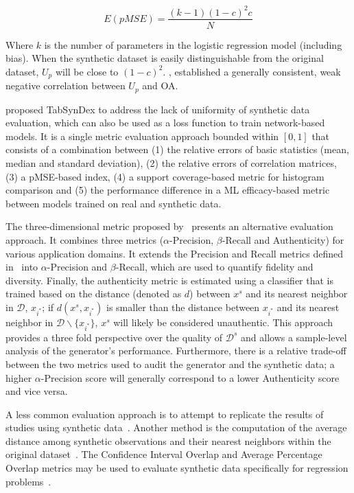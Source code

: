 \begin{equation}
    E(pMSE) = \frac{(k-1)(1-c)^2c}{N}
\end{equation}

Where $k$ is the number of parameters in the logistic regression model
(including bias). When the synthetic dataset is easily distinguishable from
the original dataset, $U_p$ will be close to ${(1-c)}^2$.
\citet{dankar2021fake}, established a generally consistent, weak negative
correlation between $U_p$ and OA\@.

\citet{chundawat2022tabsyndex} proposed TabSynDex to address the lack of
uniformity of synthetic data evaluation, which can also be used as a loss
function to train network-based models. It is a single metric evaluation
approach bounded within $[0,1]$ that consists of a combination between (1) the
relative errors of basic statistics (mean, median and standard deviation), (2)
the relative errors of correlation matrices, (3) a pMSE-based index, (4) a
support coverage-based metric for histogram comparison and (5) the performance
difference in a ML efficacy-based metric between models trained on real and
synthetic data.

The three-dimensional metric proposed by~\citet{alaa2022faithful} presents an
alternative evaluation approach. It combines three metrics
($\alpha$-Precision, $\beta$-Recall and Authenticity) for various application
domains. It extends the Precision and Recall metrics defined
in~\cite{sajjadi2018assessing} into $\alpha$-Precision and $\beta$-Recall,
which are used to quantify fidelity and diversity. Finally, the authenticity
metric is estimated using a classifier that is trained based on the distance
(denoted as $d$) between $x^s$ and its nearest neighbor in $\mathcal{D}$,
$x_{i^*}$; if $d(x^s, x_{i^*})$ is smaller than the distance between $x_{i^*}$
and its nearest neighbor in $\mathcal{D}\backslash \{x_{i^*}\}$, $x^s$ will
likely be considered unauthentic. This approach provides a three fold
perspective over the quality of $\mathcal{D}^s$ and allows a sample-level
analysis of the generator's performance. Furthermore, there is a relative
trade-off between the two metrics used to audit the generator and the
synthetic data; a higher $\alpha$-Precision score will generally correspond to
a lower Authenticity score and vice versa.

A less common evaluation approach is to attempt to replicate the results of
studies using synthetic data~\cite{el2020seven, benaim2020analyzing,
rosenblatt2022epistemic}. Another method is the computation of the
average distance among synthetic observations and their nearest neighbors
within the original dataset~\cite{hittmeir2019utility}. The Confidence
Interval Overlap and Average Percentage Overlap metrics may be used to
evaluate synthetic data specifically for regression
problems~\cite{khan2022utility, karr2006framework}.


